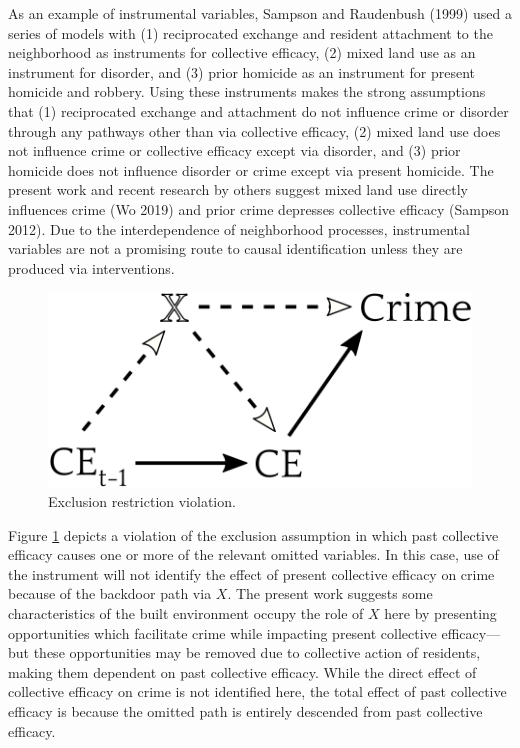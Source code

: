 \documentclass [11pt, proquest] {uwthesis}[2015/03/03]
\begin{document}
As an example of instrumental variables, Sampson and Raudenbush (1999) used a series of models with (1) reciprocated exchange and resident attachment to the neighborhood as instruments for collective efficacy, (2) mixed land use as an instrument for disorder, and (3) prior homicide as an instrument for present homicide and robbery. Using these instruments makes the strong assumptions that (1) reciprocated exchange and attachment do not influence crime or disorder through any pathways other than via collective efficacy, (2) mixed land use does not influence crime or collective efficacy except via disorder, and (3) prior homicide does not influence disorder or crime except via present homicide. The present work and recent research by others suggest mixed land use directly influences crime (Wo 2019) and prior crime depresses collective efficacy (Sampson 2012). Due to the interdependence of neighborhood processes, instrumental variables are not a promising route to causal identification unless they are produced via interventions.\linebreak
\linebreak
\begin{figure}

{\centering \includegraphics[width=0.5\linewidth]{./figure/appendix/4_bad_instrument} 

}

\caption{Exclusion restriction violation.}\label{fig:dag4}
\end{figure}
Figure \ref{fig:dag4} depicts a violation of the exclusion assumption in which past collective efficacy causes one or more of the relevant omitted variables. In this case, use of the instrument will not identify the effect of present collective efficacy on crime because of the backdoor path via \(X\). The present work suggests some characteristics of the built environment occupy the role of \(X\) here by presenting opportunities which facilitate crime while impacting present collective efficacy---but these opportunities may be removed due to collective action of residents, making them dependent on past collective efficacy. While the direct effect of collective efficacy on crime is not identified here, the total effect of past collective efficacy is because the omitted path is entirely descended from past collective efficacy.\linebreak
\end{document}

